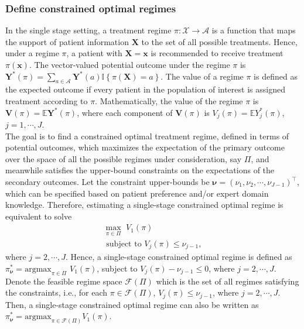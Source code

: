 \documentclass[12pt]{article}
\newcommand{\itl}{\intercal}
\newcommand{\bs}{ \boldsymbol}
\newcommand{\mb}{\mathbb}
\newcommand{\ml}{\mathcal}
\newcommand{\lt}{\left}
\newcommand{\rt}{\right}
\begin{document}
\subsubsection{Define constrained optimal regimes}
In the single stage setting, a treatment regime $\pi : \bs{\ml{X}} \rightarrow \ml{A}$ is a function that maps the support of patient information $\bs{X}$ to the set of all possible treatments. Hence, under a regime $\pi$, a patient with $\bs{X} = \bs{x}$ is recommended to receive treatment $\pi(\bs{x})$. The vector-valued potential outcome under the regime $\pi$ is $\bs{Y}^{*}(\pi) =  \sum_{a \in \ml{A}}\bs{Y}^{*}\lt(a\rt)\mb{I}\lt\{ \pi(\bs{X}) = a \rt\}$. The value of a regime $\pi$ is defined as the expected outcome if every patient in the population of interest is assigned treatment according to $\pi$. Mathematically, the value of the regime $\pi$ is $\bs{V}(\pi) = \mb{E} {\bs{Y}^{*}\lt(\pi\rt)}$, where each component of  $\bs{V}(\pi)$ is  $V_j(\pi) = \mb{E}Y_j^{*}(\pi)$, $j = 1, \cdots, J$. \\

The goal is to find a constrained optimal treatment regime, defined in terms of potential outcomes, which maximizes the expectation of the primary outcome over the space of all the possible regimes under consideration, say $\Pi$, and meanwhile satisfies the upper-bound constraints on the expectations of the secondary outcomes. Let the constraint upper-bounds be $\bs{\nu} = (\nu_1, \nu_2, \cdots, \nu_{J-1})^\itl$, which can be specified based on patient preference and/or expert domain knowledge. Therefore, estimating a single-stage  constrained optimal regime is equivalent to solve
\begin{equation}
\begin{gathered}
\max_{\pi \in \Pi} \,\, V_1\lt(\pi\rt) \\
\text{ subject to } V_j\lt(\pi\rt) \le \nu_{j-1},
\end{gathered}
\end{equation}  where $j = 2, \cdots, J$.  Hence, a single-stage constrained optimal regime is defined as $\pi^*_{\bs{\nu}} = \text{argmax}_{\pi \in \Pi} \,\, V_1(\pi)$, subject to $V_j(\pi) - \nu_{j-1} \le 0$, where $j = 2, \cdots, J$. Denote the feasible regime space $\ml{F}(\Pi)$ which is the set of all regimes satisfying the constraints, i.e., for each $\pi \in \ml{F}(\Pi)$, $V_j(\pi) \le \nu_{j-1}$, where $j = 2, \cdots, J$. Then, a single-stage constrained optimal regime can also be written as $\pi^*_{\bs{\nu}} = \text{argmax}_{\pi \in \ml{F}(\Pi)}V_1\lt(\pi\rt)$.\\
\end{document}
